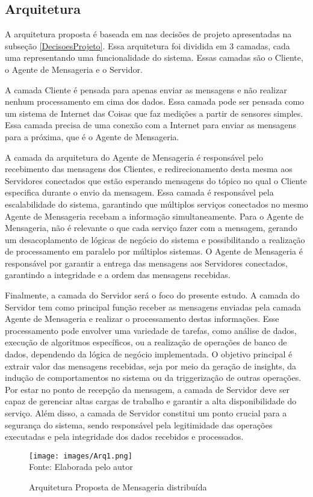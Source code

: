 \subsection{Arquitetura} \label{Arquitetura}

A arquitetura proposta é baseada em nas decisões de projeto apresentadas na subseção \ref{DecisoesProjeto}. 
Essa arquitetura foi dividida em 3 camadas, cada uma representando uma funcionalidade do sistema. 
Essas camadas são o Cliente, o Agente de Mensageria e o Servidor.

A camada Cliente é pensada para apenas enviar as mensagens e não realizar nenhum processamento em cima dos dados. 
Essa camada pode ser pensada como um sistema de Internet das Coisas que faz medições a partir de sensores simples. 
Essa camada precisa de uma conexão com a Internet para enviar as mensagens para a próxima, que é o Agente de Mensageria.

A camada da arquitetura do Agente de Mensageria é responsável pelo recebimento das mensagens dos Clientes, e redirecionamento desta mesma aos Servidores conectados que estão esperando mensagens do tópico no qual o Cliente especifica durante o envio da mensagem. 
Essa camada é responsável pela escalabilidade do sistema, garantindo que múltiplos serviços conectados no mesmo Agente de Mensageria recebam a informação simultaneamente. 
Para o Agente de Mensageria, não é relevante o que cada serviço  fazer com a mensagem, gerando um desacoplamento de lógicas de negócio do sistema e possibilitando a realização de processamento em paralelo por múltiplos sistemas.
O Agente de Mensageria é responsável por garantir a entrega das mensagens aos Servidores conectados, garantindo a integridade e a ordem das mensagens recebidas.

Finalmente, a camada do Servidor será o foco do presente estudo. A camada do Servidor tem como principal função receber as mensagens enviadas pela camada Agente de Mensageria e realizar o processamento destas informações. Esse processamento pode envolver uma variedade de tarefas, como análise de dados, execução de algoritmos específicos, ou a realização de operações de banco de dados, dependendo da lógica de negócio implementada. O objetivo principal é extrair valor das mensagens recebidas, seja por meio da geração de insights, da indução de comportamentos no sistema ou da triggerização de outras operações. Por estar no ponto de recepção da mensagem, a camada de Servidor deve ser capaz de gerenciar altas cargas de trabalho e garantir a alta disponibilidade do serviço. Além disso, a camada de Servidor constitui um ponto crucial para a segurança do sistema, sendo responsável pela legitimidade das operações executadas e pela integridade dos dados recebidos e processados.

\begin{figure}[h]
    \centering
    \caption{Arquitetura Proposta de Mensageria distribuída}
    \texttt{[image: images/Arq1.png]}\\
 Fonte: Elaborada pelo autor
    \label{fig:Arq1}
\end{figure}

\newpage



